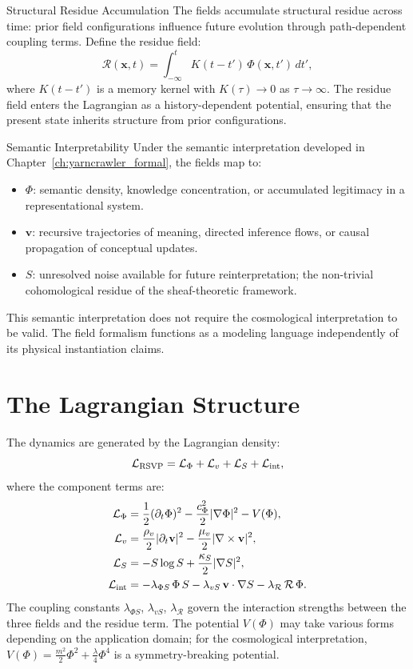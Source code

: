 \begin{axiom}{Structural Residue Accumulation}
The fields accumulate structural residue across time: prior field configurations
influence future evolution through path-dependent coupling terms. Define the
residue field:
\[
  \mathcal{R}(\mathbf{x},t) = \int_{-\infty}^{t} K(t-t')\,
  \Phi(\mathbf{x},t')\,dt',
\]
where $K(t-t')$ is a memory kernel with $K(\tau) \to 0$ as $\tau \to \infty$.
The residue field enters the Lagrangian as a history-dependent potential,
ensuring that the present state inherits structure from prior configurations.
\end{axiom}

\begin{axiom}{Semantic Interpretability}
Under the semantic interpretation developed in Chapter~\ref{ch:yarncrawler_formal},
the \RSVP fields map to:
\begin{itemize}
  \item $\Phi$: semantic density, knowledge concentration, or accumulated
    legitimacy in a representational system.
  \item $\mathbf{v}$: recursive trajectories of meaning, directed inference
    flows, or causal propagation of conceptual updates.
  \item $S$: unresolved noise available for future reinterpretation; the
    non-trivial cohomological residue of the sheaf-theoretic framework.
\end{itemize}
This semantic interpretation does not require the cosmological interpretation
to be valid. The field formalism functions as a modeling language independently
of its physical instantiation claims.
\end{axiom}

\section{The Lagrangian Structure}

The \RSVP dynamics are generated by the Lagrangian density:
\[
  \mathcal{L}_{\rm RSVP} = \mathcal{L}_\Phi + \mathcal{L}_v + \mathcal{L}_S
  + \mathcal{L}_{\rm int},
\]
where the component terms are:
\begin{align}
  \mathcal{L}_\Phi &= \frac{1}{2}(\partial_t \Phi)^2 - \frac{c_\Phi^2}{2}|\nabla\Phi|^2
    - V(\Phi), \\
  \mathcal{L}_v &= \frac{\rho_v}{2}|\partial_t \mathbf{v}|^2
    - \frac{\mu_v}{2}|\nabla \times \mathbf{v}|^2, \\
  \mathcal{L}_S &= -S\log S + \frac{\kappa_S}{2}|\nabla S|^2, \\
  \mathcal{L}_{\rm int} &= -\lambda_{\Phi S}\,\Phi\,S
    - \lambda_{vS}\,\mathbf{v}\cdot\nabla S
    - \lambda_{\mathcal{R}}\,\mathcal{R}\,\Phi.
\end{align}
The coupling constants $\lambda_{\Phi S}$, $\lambda_{vS}$, $\lambda_{\mathcal{R}}$
govern the interaction strengths between the three fields and the residue term.
The potential $V(\Phi)$ may take various forms depending on the application
domain; for the cosmological interpretation, $V(\Phi) = \frac{m^2}{2}\Phi^2 +
\frac{\lambda}{4}\Phi^4$ is a symmetry-breaking potential.

